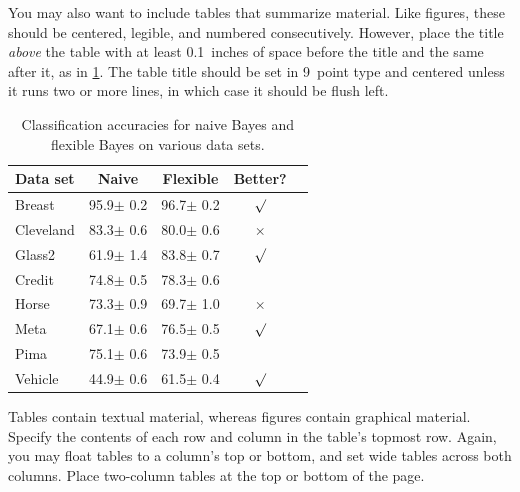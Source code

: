 \documentclass{article}
\theoremstyle{plain}
\theoremstyle{definition}
\theoremstyle{remark}
\begin{document}
You may also want to include tables that summarize material. Like
figures, these should be centered, legible, and numbered consecutively.
However, place the title \emph{above} the table with at least
0.1~inches of space before the title and the same after it, as in
\cref{sample-table}. The table title should be set in 9~point
type and centered unless it runs two or more lines, in which case it
should be flush left.


\begin{table}[t]
\caption{Classification accuracies for naive Bayes and flexible
Bayes on various data sets.}
\label{sample-table}
\vskip 0.15in
\begin{center}
\begin{small}
\begin{sc}
\begin{tabular}{lcccr}
\toprule
Data set & Naive & Flexible & Better? \\
\midrule
Breast    & 95.9$\pm$ 0.2& 96.7$\pm$ 0.2& $\surd$ \\
Cleveland & 83.3$\pm$ 0.6& 80.0$\pm$ 0.6& $\times$\\
Glass2    & 61.9$\pm$ 1.4& 83.8$\pm$ 0.7& $\surd$ \\
Credit    & 74.8$\pm$ 0.5& 78.3$\pm$ 0.6&         \\
Horse     & 73.3$\pm$ 0.9& 69.7$\pm$ 1.0& $\times$\\
Meta      & 67.1$\pm$ 0.6& 76.5$\pm$ 0.5& $\surd$ \\
Pima      & 75.1$\pm$ 0.6& 73.9$\pm$ 0.5&         \\
Vehicle   & 44.9$\pm$ 0.6& 61.5$\pm$ 0.4& $\surd$ \\
\bottomrule
\end{tabular}
\end{sc}
\end{small}
\end{center}
\vskip -0.1in
\end{table}

Tables contain textual material, whereas figures contain graphical material.
Specify the contents of each row and column in the table's topmost
row. Again, you may float tables to a column's top or bottom, and set
wide tables across both columns. Place two-column tables at the
top or bottom of the page.
\end{document}
